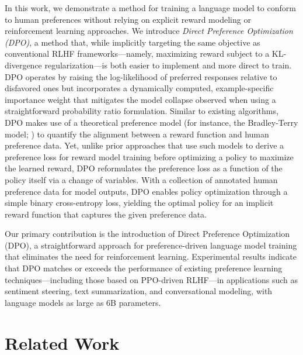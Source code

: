 In this work, we demonstrate a method for training a language model to conform to human preferences without relying on explicit reward modeling or reinforcement learning approaches. We introduce \textit{Direct Preference Optimization (DPO)}, a method that, while implicitly targeting the same objective as conventional RLHF frameworks—namely, maximizing reward subject to a KL-divergence regularization—is both easier to implement and more direct to train. DPO operates by raising the log-likelihood of preferred responses relative to disfavored ones but incorporates a dynamically computed, example-specific importance weight that mitigates the model collapse observed when using a straightforward probability ratio formulation. Similar to existing algorithms, DPO makes use of a theoretical preference model (for instance, the Bradley-Terry model; \cite{bradley1952rankanalysis}) to quantify the alignment between a reward function and human preference data. Yet, unlike prior approaches that use such models to derive a preference loss for reward model training before optimizing a policy to maximize the learned reward, DPO reformulates the preference loss as a function of the policy itself via a change of variables. With a collection of annotated human preference data for model outputs, DPO enables policy optimization through a simple binary cross-entropy loss, yielding the optimal policy for an implicit reward function that captures the given preference data.

Our primary contribution is the introduction of Direct Preference Optimization (DPO), a straightforward approach for preference-driven language model training that eliminates the need for reinforcement learning. Experimental results indicate that DPO matches or exceeds the performance of existing preference learning techniques—including those based on PPO-driven RLHF—in applications such as sentiment steering, text summarization, and conversational modeling, with language models as large as 6B parameters.

\section{Related Work}

